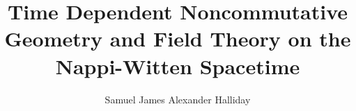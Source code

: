\documentclass{hwthesis}
\begin{document}

\title{Time Dependent Noncommutative Geometry and Field Theory on the
  Nappi-Witten Spacetime}

\author{Samuel James Alexander Halliday}
\maketitle


%
\tableofcontents
\clearpage
{}







\end{document}
